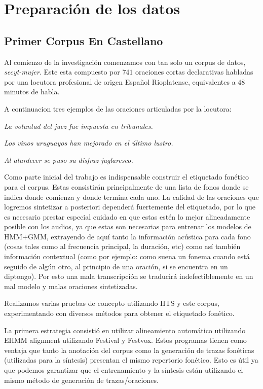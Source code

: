 \section{Preparación de los datos}

\subsection{Primer Corpus En Castellano}

Al comienzo de la investigación comenzamos con tan solo un corpus de datos, \textit{secyt-mujer}\cite{secytMujer}. Este esta compuesto por $741$ oraciones cortas declarativas habladas por una locutora profesional de origen Español Rioplatense, equivalentes a $48$ minutos de habla.

A continuacion tres ejemplos de las oraciones articuladas por la locutora:

\indent\indent \textit{La voluntad del juez fue impuesta en tribunales.}

\indent\indent \textit{Los vinos uruguayos han mejorado en el último lustro.}

\indent\indent \textit{Al atardecer se puso su disfraz juglaresco.}

Como parte inicial del trabajo es indispensable construir el etiquetado fonético para el corpus. Estas consistirán principalmente de una lista de fonos donde se indica donde comienza y donde termina cada uno. La calidad de las oraciones que logremos sintetizar a posteriori dependerá fuertemente del etiquetado, por lo que es necesario prestar especial cuidado en que estas estén lo mejor alineadamente posible con los audios, ya que estas son necesarias para entrenar los modelos de HMM+GMM, extrayendo de aquí tanto la información acústica para cada fono (cosas tales como al frecuencia principal, la duración, etc) como así también información contextual (como por ejemplo: como suena un fonema cuando está seguido de algún otro, al principio de una oración, si se encuentra en un diptongo). Por esto una mala transcripción se traducirá indefectiblemente en un mal modelo y malas oraciones sintetizadas.

Realizamos varias pruebas de concepto utilizando HTS y este corpus, experimentando con diversos métodos para obtener el etiquetado fonético. 

La primera estrategia consistió en utilizar alineamiento automático utilizando EHMM alignment \cite{phoneticCapturing} utilizando Festival y Festvox. Estos programas tienen como ventaja que tanto la anotación del corpus como la generación de trazas fonéticas (utilizadas para la síntesis) presentan el mismo repertorio fonético. Esto es útil ya que podemos garantizar que el entrenamiento y la síntesis están utilizando el mismo método de generación de trazas/oraciones.

